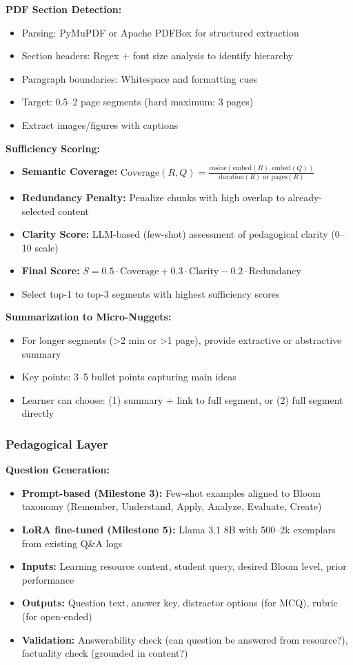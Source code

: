 \documentclass[11pt,letterpaper]{article}
\begin{document}
\textbf{PDF Section Detection:}
\begin{itemize}
\item Parsing: PyMuPDF or Apache PDFBox for structured extraction
\item Section headers: Regex + font size analysis to identify hierarchy
\item Paragraph boundaries: Whitespace and formatting cues
\item Target: 0.5--2 page segments (hard maximum: 3 pages)
\item Extract images/figures with captions
\end{itemize}

\textbf{Sufficiency Scoring:}
\begin{itemize}
\item \textbf{Semantic Coverage:} $\text{Coverage}(R, Q) = \frac{\text{cosine}(\text{embed}(R), \text{embed}(Q))}{\text{duration}(R) \text{ or } \text{pages}(R)}$
\item \textbf{Redundancy Penalty:} Penalize chunks with high overlap to already-selected content
\item \textbf{Clarity Score:} LLM-based (few-shot) assessment of pedagogical clarity (0--10 scale)
\item \textbf{Final Score:} $S = 0.5 \cdot \text{Coverage} + 0.3 \cdot \text{Clarity} - 0.2 \cdot \text{Redundancy}$
\item Select top-1 to top-3 segments with highest sufficiency scores
\end{itemize}

\textbf{Summarization to Micro-Nuggets:}
\begin{itemize}
\item For longer segments (>2 min or >1 page), provide extractive or abstractive summary
\item Key points: 3--5 bullet points capturing main ideas
\item Learner can choose: (1) summary + link to full segment, or (2) full segment directly
\end{itemize}

\subsubsection{Pedagogical Layer}

\textbf{Question Generation:}
\begin{itemize}
\item \textbf{Prompt-based (Milestone 3):} Few-shot examples aligned to Bloom taxonomy (Remember, Understand, Apply, Analyze, Evaluate, Create)
\item \textbf{LoRA fine-tuned (Milestone 5):} Llama 3.1 8B with 500--2k exemplars from existing Q\&A logs
\item \textbf{Inputs:} Learning resource content, student query, desired Bloom level, prior performance
\item \textbf{Outputs:} Question text, answer key, distractor options (for MCQ), rubric (for open-ended)
\item \textbf{Validation:} Answerability check (can question be answered from resource?), factuality check (grounded in content?)
\end{itemize}
\end{document}
